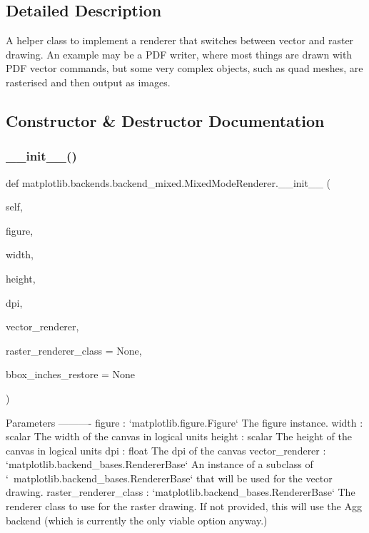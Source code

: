 \subsection{Detailed Description}
\begin{DoxyVerb}A helper class to implement a renderer that switches between
vector and raster drawing.  An example may be a PDF writer, where
most things are drawn with PDF vector commands, but some very
complex objects, such as quad meshes, are rasterised and then
output as images.
\end{DoxyVerb}
 

\subsection{Constructor \& Destructor Documentation}
\mbox{\label{classmatplotlib_1_1backends_1_1backend__mixed_1_1MixedModeRenderer_aed16a9fb82c6af6a79cf669a10e4e2de}} 
\subsubsection{\texorpdfstring{\+\_\+\+\_\+init\+\_\+\+\_\+()}{\_\_init\_\_()}}
{\footnotesize\ttfamily def matplotlib.\+backends.\+backend\+\_\+mixed.\+Mixed\+Mode\+Renderer.\+\_\+\+\_\+init\+\_\+\+\_\+ (\begin{DoxyParamCaption}\item[{}]{self,  }\item[{}]{figure,  }\item[{}]{width,  }\item[{}]{height,  }\item[{}]{dpi,  }\item[{}]{vector\+\_\+renderer,  }\item[{}]{raster\+\_\+renderer\+\_\+class = {\ttfamily None},  }\item[{}]{bbox\+\_\+inches\+\_\+restore = {\ttfamily None} }\end{DoxyParamCaption})}

\begin{DoxyVerb}Parameters
----------
figure : `matplotlib.figure.Figure`
    The figure instance.
width : scalar
    The width of the canvas in logical units
height : scalar
    The height of the canvas in logical units
dpi : float
    The dpi of the canvas
vector_renderer : `matplotlib.backend_bases.RendererBase`
    An instance of a subclass of
    `~matplotlib.backend_bases.RendererBase` that will be used for the
    vector drawing.
raster_renderer_class : `matplotlib.backend_bases.RendererBase`
    The renderer class to use for the raster drawing.  If not provided,
    this will use the Agg backend (which is currently the only viable
    option anyway.)\end{DoxyVerb}
 

